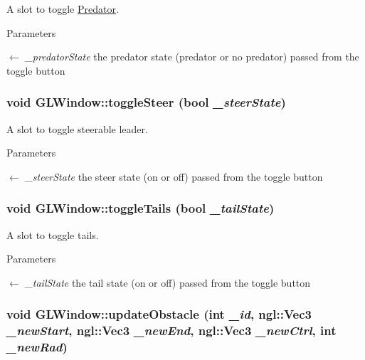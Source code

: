 A slot to toggle \hyperlink{classPredator}{Predator}. 
\begin{DoxyParams}{Parameters}
\item[\mbox{$\leftarrow$} {\em \_\-predatorState}]the predator state (predator or no predator) passed from the toggle button \end{DoxyParams}
\hypertarget{classGLWindow_a49dd1428dd40fd7862dbebe503f71e8d}{
\subsubsection[{toggleSteer}]{\setlength{\rightskip}{0pt plus 5cm}void GLWindow::toggleSteer (bool {\em \_\-steerState})}}
\label{classGLWindow_a49dd1428dd40fd7862dbebe503f71e8d}


A slot to toggle steerable leader. 
\begin{DoxyParams}{Parameters}
\item[\mbox{$\leftarrow$} {\em \_\-steerState}]the steer state (on or off) passed from the toggle button \end{DoxyParams}
\hypertarget{classGLWindow_a447a172182f361c2965bf25b21434441}{
\subsubsection[{toggleTails}]{\setlength{\rightskip}{0pt plus 5cm}void GLWindow::toggleTails (bool {\em \_\-tailState})}}
\label{classGLWindow_a447a172182f361c2965bf25b21434441}


A slot to toggle tails. 
\begin{DoxyParams}{Parameters}
\item[\mbox{$\leftarrow$} {\em \_\-tailState}]the tail state (on or off) passed from the toggle button \end{DoxyParams}
\hypertarget{classGLWindow_ad611fcce0ca43aed0b6fd41df781293f}{
\subsubsection[{updateObstacle}]{\setlength{\rightskip}{0pt plus 5cm}void GLWindow::updateObstacle (int {\em \_\-id}, \/  ngl::Vec3 {\em \_\-newStart}, \/  ngl::Vec3 {\em \_\-newEnd}, \/  ngl::Vec3 {\em \_\-newCtrl}, \/  int {\em \_\-newRad})}}
\label{classGLWindow_ad611fcce0ca43aed0b6fd41df781293f}


